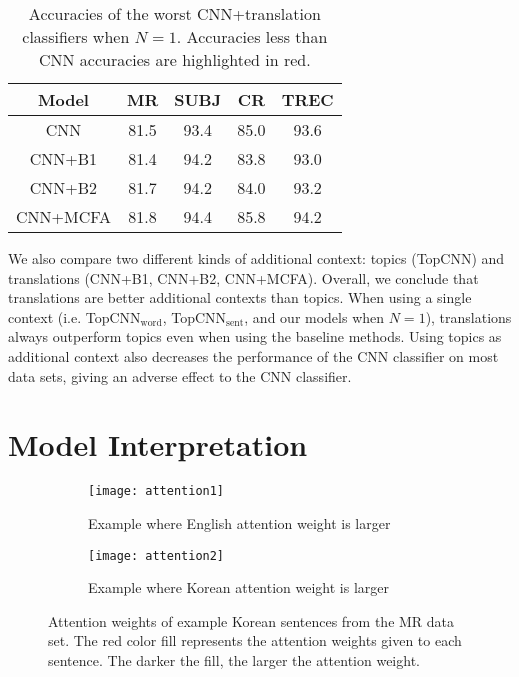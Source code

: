 \documentclass{article}
\begin{document}
\begin{table}[t]
	\scriptsize
  \centering
    \begin{tabular}{|c|c|c|c|c|}
    \hline
    \textbf{Model} & {\textbf{MR}} & \textbf{SUBJ} & \textbf{CR} & {\textbf{TREC}} \\
    \hline
    CNN   & 81.5  & 93.4  & 85.0    & 93.6 \\
    \hline
    CNN+B1 & \textcolor[rgb]{ 1,  0,  0}{81.4} & 94.2  & \textcolor[rgb]{ 1,  0,  0}{83.8} & \textcolor[rgb]{ 1,  0,  0}{93.0} \\
    CNN+B2 & 81.7  & 94.2  & \textcolor[rgb]{ 1,  0,  0}{84.0} & \textcolor[rgb]{ 1,  0,  0}{93.2} \\
    CNN+MCFA & 81.8  & 94.4  & 85.8  & 94.2 \\
    \hline
    \end{tabular}\caption{Accuracies of the worst CNN+translation classifiers when $N=1$. Accuracies less than CNN accuracies are highlighted in \textcolor[rgb]{1,0,0}{red}.}
  \label{tab:minresult}\end{table}

We also compare two different kinds of additional context: topics (TopCNN) and translations (CNN+B1, CNN+B2, CNN+MCFA). Overall, we conclude that translations are better additional contexts than topics. When using a single context (i.e. TopCNN$_\text{word}$, TopCNN$_\text{sent}$, and our models when $N=1$), translations always outperform topics even when using the baseline methods. Using topics as additional context also decreases the performance of the CNN classifier on most data sets, giving an adverse effect to the CNN classifier.



\section{Model Interpretation}

\begin{figure}[t]
	\centering
	\begin{subfigure}{0.4\textwidth}
		\centering
		\texttt{[image: attention1]}
		\caption{Example where English attention weight is larger}
	\end{subfigure}
	\begin{subfigure}{0.4\textwidth}
		\centering
		\texttt{[image: attention2]}
		\caption{Example where Korean attention weight is larger}
	\end{subfigure}
	\caption{Attention weights of example Korean sentences from the MR data set. The red color fill represents the attention weights given to each sentence. The darker the fill, the larger the attention weight.}
	\label{fig:attention}
\end{figure}
\end{document}
